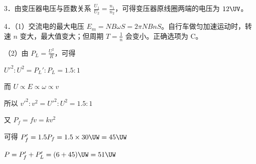 \documentclass[\gkver]{gaokaozhenti}
\begin{document}
\begin{enumerate}
{3．由变压器电压与匝数关系 $\frac{U_{1}}{U_{2}} = \frac{n_{1}}{n_{2}}$，可得变压器原线圈两端的电压为 $12 \UV$。

4．（1）交流电的最大电压 $E_{m} = NB\omega S = 2\pi NBnS$。自行车做匀加速运动时，转速 $n$ 变大，最大值变大；但周期 $T = \frac{1}{n}$ 会变小。正确选项为 C。

（2）由 $P_{L} = \frac{U^{2}}{R}$，可得

$U'^{2}:U^{2} = P_{L}':P_{L} = 1.5:1$

而 $U \propto E \propto \omega \propto v$

所以 $v'^{2}:v^{2} = U'^{2}:U^{2} = 1.5:1$

又 $P_{f} = fv = kv^{2}$

可得 $P_{f}' = 1.5P_{f} = 1.5 \times 30 \UW = 45 \UW$

$P = P_{f}' + P_{L}' = (6 + 45) \UW = 51 \UW$
}

\end{enumerate}
\end{document}
